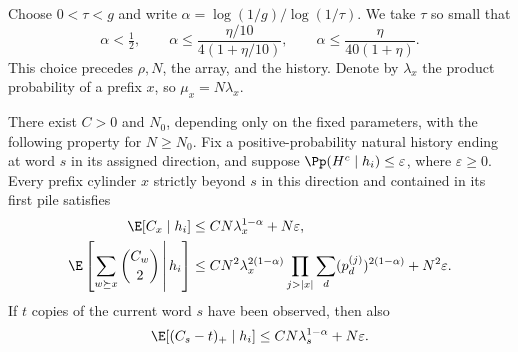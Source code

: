 Choose $0<\tau<g$ and write
$\alpha=\log(1/g)/\log(1/\tau)$. We take $\tau$ so small that
\begin{equation}\label{eq:upper-alpha}
 \alpha<\tfrac12,\qquad
 \alpha\le\frac{\eta/10}{4(1+\eta/10)},\qquad
 \alpha\le\frac{\eta}{40(1+\eta)}.
\end{equation}
This choice precedes $\rho,N$, the array, and the history. Denote by
$\lambda_x$ the product probability of a prefix $x$, so
$\mu_x=N\lambda_x$.

\begin{lemma}\label{lem:upper-reservoir}
There exist $C>0$ and $N_0$, depending only on the fixed parameters,
with the following property for $N\ge N_0$.
Fix a positive-probability natural history ending at word $s$ in its
assigned direction, and suppose $\Pp(H^c\mid h_i)\le\varepsilon$,
where $\varepsilon\ge0$. Every prefix cylinder $x$ strictly beyond $s$ in this
direction and contained in its first pile satisfies
\begin{align}
 \E[C_x\mid h_i]&\le CN\lambda_x^{1-\alpha}+N\varepsilon,
                                           \label{eq:upper-reservoir-count}\\
 \E\left[\sum_{w\succeq x}\binom{C_w}{2}\,\middle|\,h_i\right]
 &\le CN^2\lambda_x^{2(1-\alpha)}
       \prod_{j>|x|}\sum_d(p_d^{(j)})^{2(1-\alpha)}
                  +N^2\varepsilon.          \label{eq:upper-reservoir-pairs}
\end{align}
If $t$ copies of the current word $s$ have been observed, then also
\begin{equation}\label{eq:upper-extra-copies}
 \E[(C_s-t)_+\mid h_i]
       \le CN\lambda_s^{1-\alpha}+N\varepsilon.
\end{equation}
\end{lemma}
